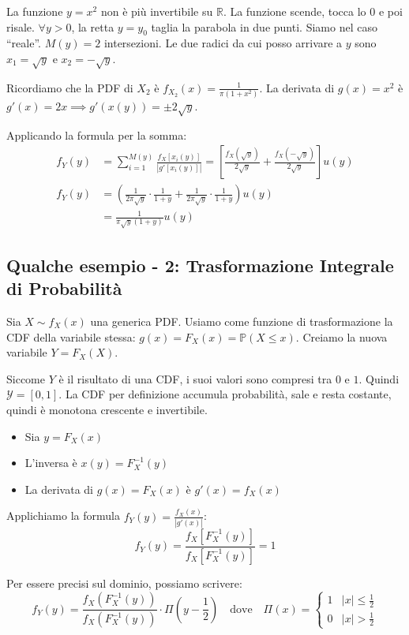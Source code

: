 La funzione $y = x^2$ non è più invertibile su $\mathbb{R}$. La funzione scende, tocca lo $0$ e poi risale. $\forall y > 0$, la retta $y = y_0$ taglia la parabola in due punti.
Siamo nel caso ``reale''. $M(y) = 2$ intersezioni. Le due radici da cui posso arrivare a $y$ sono $x_1 = \sqrt{y}$ e $x_2 = -\sqrt{y}$.

Ricordiamo che la PDF di $X_2$ è $f_{X_2}(x) = \frac{1}{\pi(1+x^2)}$.
La derivata di $g(x) = x^2$ è $g'(x) = 2x \implies g'(x(y)) = \pm 2\sqrt{y}$.

Applicando la formula per la somma:
\begin{align}
f_Y(y) &= \sum_{i=1}^{M(y)} \frac{f_X[x_i(y)]}{|g'[x_i(y)]|} = \left[ \frac{f_X(\sqrt{y})}{2\sqrt{y}} + \frac{f_X(-\sqrt{y})}{2\sqrt{y}} \right] u(y) \nonumber \\
f_Y(y) &= \left( \frac{1}{2\pi\sqrt{y}} \cdot \frac{1}{1+y} + \frac{1}{2\pi\sqrt{y}} \cdot \frac{1}{1+y} \right) u(y) \nonumber \\
&= \frac{1}{\pi\sqrt{y}(1+y)} u(y)
\end{align}


\subsection{Qualche esempio - 2: Trasformazione Integrale di Probabilità}

Sia $X \sim f_X(x)$ una generica PDF. Usiamo come funzione di trasformazione la CDF della variabile stessa: $g(x) = F_X(x) = \mathbb{P}(X \le x)$.
Creiamo la nuova variabile $Y = F_X(X)$.

Siccome $Y$ è il risultato di una CDF, i suoi valori sono compresi tra $0$ e $1$. Quindi $\mathcal{Y} = [0, 1]$.
La CDF per definizione accumula probabilità, sale e resta costante, quindi è monotona crescente e invertibile.

\begin{itemize}
    \item Sia $y = F_X(x)$
    \item L'inversa è $x(y) = F_X^{-1}(y)$
    \item La derivata di $g(x) = F_X(x)$ è $g'(x) = f_X(x)$
\end{itemize}

Applichiamo la formula $f_Y(y) = \frac{f_X(x)}{|g'(x)|}$:
\begin{equation}
f_Y(y) = \frac{f_X[F_X^{-1}(y)]}{f_X[F_X^{-1}(y)]} = 1
\end{equation}

Per essere precisi sul dominio, possiamo scrivere:
\begin{equation}
f_Y(y) = \frac{f_X(F_X^{-1}(y))}{f_X(F_X^{-1}(y))} \cdot \Pi\left(y - \frac{1}{2}\right) \quad \text{dove} \quad \Pi(x) = 
\begin{cases} 
1 & |x| \le \frac{1}{2} \\ 
0 & |x| > \frac{1}{2} 
\end{cases}
\end{equation}

